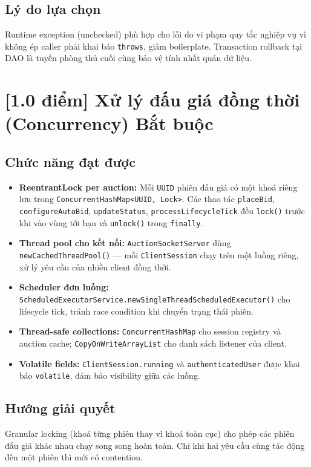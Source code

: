 \documentclass[12pt,a4paper]{article}
\newcommand{\score}[1]{\textbf{[#1 điểm]}}
\newcommand{\mandatory}{\textcolor{mandatorycolor}{\textbf{Bắt buộc}}}
\newcommand{\filepath}[1]{\texttt{\small #1}}
\begin{document}
\subsection*{Lý do lựa chọn}
Runtime exception (unchecked) phù hợp cho lỗi do vi phạm quy tắc nghiệp vụ vì không ép caller phải khai báo \texttt{throws}, giảm boilerplate. Transaction rollback tại DAO là tuyến phòng thủ cuối cùng bảo vệ tính nhất quán dữ liệu.

\section{\score{1.0} Xử lý đấu giá đồng thời (Concurrency) \hfill \mandatory}

\subsection*{Chức năng đạt được}

\begin{itemize}[leftmargin=1.5em]
  \item \textbf{ReentrantLock per auction:} Mỗi \texttt{UUID} phiên đấu giá có một khoá riêng lưu trong \texttt{ConcurrentHashMap<UUID, Lock>}. Các thao tác \texttt{placeBid}, \texttt{configureAutoBid}, \texttt{updateStatus}, \texttt{processLifecycleTick} đều \texttt{lock()} trước khi vào vùng tới hạn và \texttt{unlock()} trong \texttt{finally}.
  \item \textbf{Thread pool cho kết nối:} \filepath{AuctionSocketServer} dùng \texttt{newCachedThreadPool()} — mỗi \texttt{ClientSession} chạy trên một luồng riêng, xử lý yêu cầu của nhiều client đồng thời.
  \item \textbf{Scheduler đơn luồng:} \texttt{ScheduledExecutorService.newSingleThreadScheduledExecutor()} cho lifecycle tick, tránh race condition khi chuyển trạng thái phiên.
  \item \textbf{Thread-safe collections:} \texttt{ConcurrentHashMap} cho session registry và auction cache; \texttt{CopyOnWriteArrayList} cho danh sách listener của client.
  \item \textbf{Volatile fields:} \texttt{ClientSession.running} và \texttt{authenticatedUser} được khai báo \texttt{volatile}, đảm bảo visibility giữa các luồng.
\end{itemize}

\subsection*{Hướng giải quyết}
Granular locking (khoá từng phiên thay vì khoá toàn cục) cho phép các phiên đấu giá khác nhau chạy song song hoàn toàn. Chỉ khi hai yêu cầu cùng tác động đến một phiên thì mới có contention.
\end{document}
